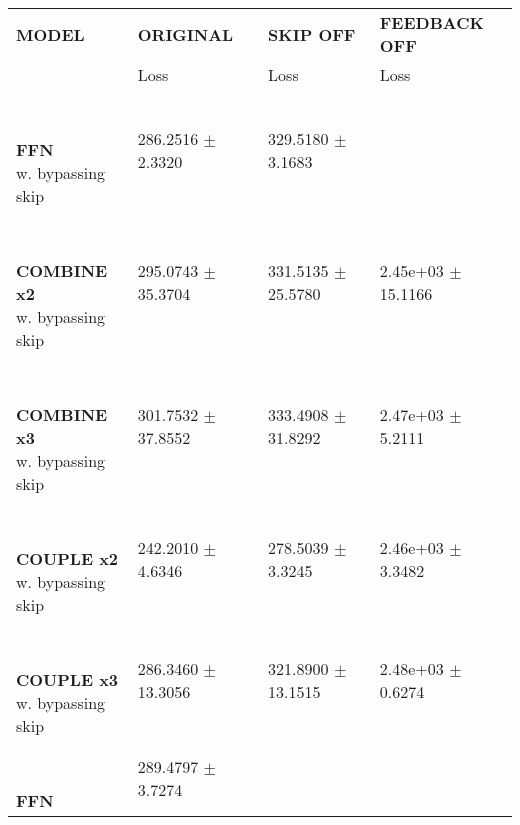 
\begin{table}[ht]
    \centering
    \begin{tabular}{|>{\columncolor{gray!05}}l|l|l|l|}
        \hline
        \rowcolor{white}
        \textbf{\footnotesize MODEL} & \textbf{\footnotesize ORIGINAL} & \textbf{\footnotesize SKIP OFF} & \textbf{\footnotesize FEEDBACK OFF} \\

        \rowcolor{white}
        & {\footnotesize Loss} & {\footnotesize Loss} & {\footnotesize Loss} \\
        \hline
\shortstack[l]{\\ {} \\ \textbf{\footnotesize FFN}\\{\footnotesize w. bypassing skip}} & {\footnotesize 286.2516 $\pm$ 2.3320} & {\footnotesize 329.5180 $\pm$ 3.1683} &  \\
 \hline 
\shortstack[l]{\\ {} \\ \textbf{\footnotesize COMBINE x2}\\{\footnotesize w. bypassing skip}} & {\footnotesize 295.0743 $\pm$ 35.3704} & {\footnotesize 331.5135 $\pm$ 25.5780} & {\footnotesize 2.45e+03 $\pm$ 15.1166} \\
 \hline 
\shortstack[l]{\\ {} \\ \textbf{\footnotesize COMBINE x3}\\{\footnotesize w. bypassing skip}} & {\footnotesize 301.7532 $\pm$ 37.8552} & {\footnotesize 333.4908 $\pm$ 31.8292} & {\footnotesize 2.47e+03 $\pm$ 5.2111} \\
 \hline 
\shortstack[l]{\\ {} \\ \textbf{\footnotesize COUPLE x2}\\{\footnotesize w. bypassing skip}} & {\footnotesize 242.2010 $\pm$ 4.6346} & {\footnotesize 278.5039 $\pm$ 3.3245} & {\footnotesize 2.46e+03 $\pm$ 3.3482} \\
 \hline 
\shortstack[l]{\\ {} \\ \textbf{\footnotesize COUPLE x3}\\{\footnotesize w. bypassing skip}} & {\footnotesize 286.3460 $\pm$ 13.3056} & {\footnotesize 321.8900 $\pm$ 13.1515} & {\footnotesize 2.48e+03 $\pm$ 0.6274} \\
 \hline 
\shortstack[l]{\\ {} \\ \textbf{\footnotesize FFN}\\{\footnotesize }} & {\footnotesize 289.4797 $\pm$ 3.7274} &  &  \\

\end{tabular}
\end{table}
